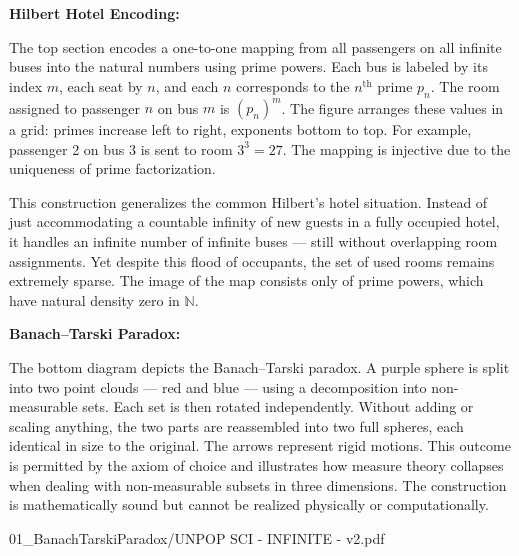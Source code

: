 \begin{SideNotePage}{
  \textbf{Hilbert Hotel Encoding:} \par
  The top section encodes a one-to-one mapping from all passengers on all infinite buses into the natural numbers using prime powers. Each bus is labeled by its index $m$, each seat by $n$, and each $n$ corresponds to the $n^\text{th}$ prime $p_n$. The room assigned to passenger $n$ on bus $m$ is $(p_n)^m$. The figure arranges these values in a grid: primes increase left to right, exponents bottom to top. For example, passenger 2 on bus 3 is sent to room $3^3 = 27$. The mapping is injective due to the uniqueness of prime factorization.

  \vspace{0.5em}
  This construction generalizes the common Hilbert’s hotel situation. Instead of just accommodating a countable infinity of new guests in a fully occupied hotel, it handles an infinite number of infinite buses — still without overlapping room assignments. Yet despite this flood of occupants, the set of used rooms remains extremely sparse. The image of the map consists only of prime powers, which have natural density zero in $\mathbb{N}$.
  
  \vspace{1.5em}
  \textbf{Banach–Tarski Paradox:} \par
  The bottom diagram depicts the Banach–Tarski paradox. A purple sphere is split into two point clouds — red and blue — using a decomposition into non-measurable sets. Each set is then rotated independently. Without adding or scaling anything, the two parts are reassembled into two full spheres, each identical in size to the original. The arrows represent rigid motions. This outcome is permitted by the axiom of choice and illustrates how measure theory collapses when dealing with non-measurable subsets in three dimensions. The construction is mathematically sound but cannot be realized physically or computationally.
}{01_BanachTarskiParadox/UNPOP SCI - INFINITE - v2.pdf}
\end{SideNotePage}
